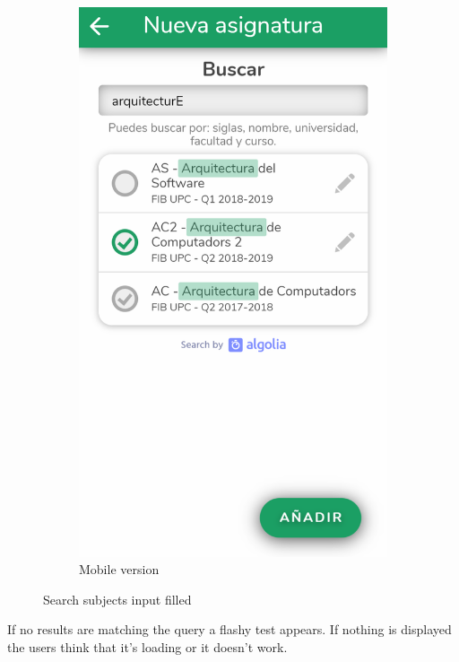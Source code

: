 \begin{figure}[ht!]
\begin{subfigure}[b]{0.243\textwidth-0.1cm}
        \includegraphics[frame,width=\textwidth]{media/screenshots/screenshot-search-filled.png}
        \caption{Mobile version}
    \end{subfigure}
    \caption{Search subjects input filled}
    \label{fig:search-filled}
\end{figure}
\vfill

\clearpage\newpage
If no results are matching the query a flashy test appears. If nothing is displayed the users think that it's loading or it doesn't work. 

